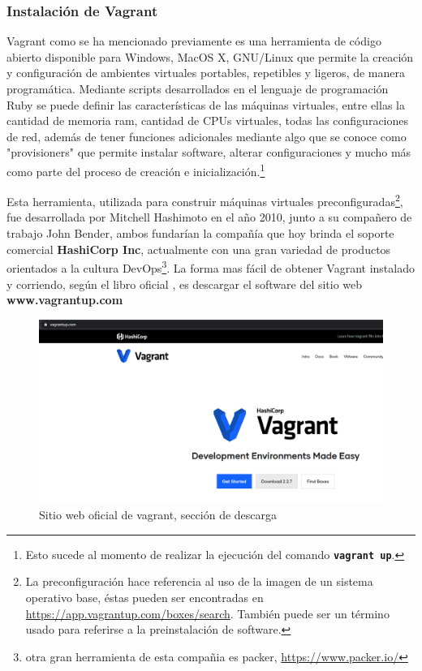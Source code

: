 \documentclass[letterpaper, 12pt, oneside]{article}
\begin{document}
    \subsubsection{Instalación de Vagrant}
    Vagrant como se ha mencionado previamente es una herramienta de código abierto disponible para Windows, MacOS X,  GNU/Linux que permite la creación y configuración de ambientes virtuales portables, repetibles y ligeros, de manera programática. Mediante scripts desarrollados en el lenguaje de programación Ruby se puede definir las características de las máquinas virtuales, entre ellas la cantidad de memoria ram, cantidad de CPUs virtuales, todas las configuraciones de red, además de tener funciones adicionales mediante algo que se conoce como "provisioners" que permite instalar software, alterar configuraciones y mucho más como parte del proceso de creación e inicialización.\footnote{Esto sucede al momento de realizar la ejecución del comando \textbf{\texttt{vagrant up}}. }
    
    Esta herramienta, utilizada para construir máquinas virtuales preconfiguradas\footnote{La preconfiguración hace referencia al uso de la imagen de un sistema operativo base, éstas pueden ser encontradas en \url{https://app.vagrantup.com/boxes/search}. También puede ser un término usado para referirse a la preinstalación de software.  },  fue desarrollada por Mitchell Hashimoto en el año 2010, junto a su compañero de trabajo John Bender, ambos fundarían la compañía que hoy brinda el soporte comercial \textbf{HashiCorp Inc}, actualmente con una gran variedad de productos orientados a la cultura DevOps\footnote{otra gran herramienta de esta compañia es packer, \url{https://www.packer.io/}}. La forma mas fácil de obtener Vagrant instalado y corriendo, según el libro oficial \cite{vagrantup}, es descargar el software del sitio web \textbf{www.vagrantup.com}
     
    \begin{figure}[H]
        \includegraphics[scale=0.9]{img/install/vagrant0.png}
        \caption{Sitio web oficial de vagrant, sección de descarga}
        \label{fig:va0}
    \end{figure}
    
\end{document}
